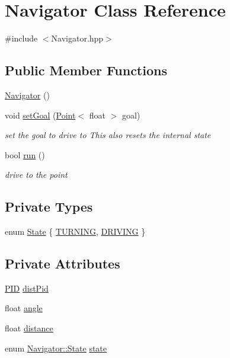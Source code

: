 \hypertarget{classNavigator}{\section{Navigator Class Reference}
\label{classNavigator}
}


{\ttfamily \#include $<$Navigator.\-hpp$>$}

\subsection*{Public Member Functions}
\begin{DoxyCompactItemize}
\item 
\hyperlink{classNavigator_a59230ab4698882f754d5ce275a1a4030}{Navigator} ()
\item 
void \hyperlink{classNavigator_a14da808a74fdc15ae4e0781060884ef8}{set\-Goal} (\hyperlink{classPoint}{Point}$<$ float $>$ goal)
\begin{DoxyCompactList}\small\item\em set the goal to drive to This also resets the internal state \end{DoxyCompactList}\item 
bool \hyperlink{classNavigator_a8841b985afa17a86112b8522ee6913e6}{run} ()
\begin{DoxyCompactList}\small\item\em drive to the point \end{DoxyCompactList}\end{DoxyCompactItemize}
\subsection*{Private Types}
\begin{DoxyCompactItemize}
\item 
enum \hyperlink{classNavigator_aae36be38543e3fae30dc53208e2f9913}{State} \{ \hyperlink{classNavigator_aae36be38543e3fae30dc53208e2f9913a80d7d232a04edaac4c8055a05242790b}{T\-U\-R\-N\-I\-N\-G}, 
\hyperlink{classNavigator_aae36be38543e3fae30dc53208e2f9913a9f34e19722c2c3385c6fe61d8de249e7}{D\-R\-I\-V\-I\-N\-G}
 \}
\end{DoxyCompactItemize}
\subsection*{Private Attributes}
\begin{DoxyCompactItemize}
\item 
\hyperlink{classPID}{P\-I\-D} \hyperlink{classNavigator_ab6f4e8b5937d700d4514c438cb7b3927}{dist\-Pid}
\item 
float \hyperlink{classNavigator_a20335cc0cf85bdd18af14ee2dfbd1501}{angle}
\item 
float \hyperlink{classNavigator_accc10be1bc4dfe67ce799e69869f0caa}{distance}
\item 
enum \hyperlink{classNavigator_aae36be38543e3fae30dc53208e2f9913}{Navigator\-::\-State} \hyperlink{classNavigator_a15263fe64d0ea29a1bbfe9e5ef849c4c}{state}
\end{DoxyCompactItemize}


